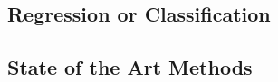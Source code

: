 \documentclass[../main.tex]{subfiles}
\begin{document}
\subsection{Regression or Classification}


\subsection{State of the Art Methods}


\end{document}
